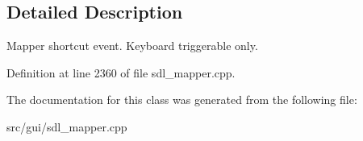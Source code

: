 \subsection{Detailed Description}
Mapper shortcut event. Keyboard triggerable only. 

Definition at line 2360 of file sdl\-\_\-mapper.\-cpp.



The documentation for this class was generated from the following file\-:\begin{DoxyCompactItemize}
\item 
src/gui/sdl\-\_\-mapper.\-cpp\end{DoxyCompactItemize}
